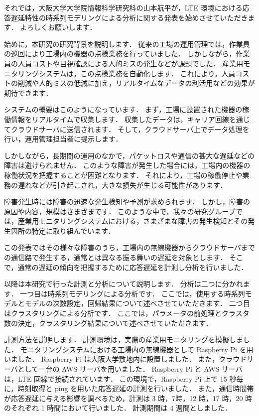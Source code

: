 \documentclass[a4j]{jarticle}
\begin{document}
それでは，大阪大学大学院情報科学研究科の山本航平が，LTE 環境における応答遅延特性の時系列モデリングによる分析に関する発表を始めさせていただきます．
よろしくお願いします．

始めに，本研究の研究背景を説明します．
従来の工場の運用管理では，作業員の巡回により工場内の機器の点検業務を行っていました．
しかしながら，作業員の人員コストや目視確認による人的ミスの発生などが課題でした．
産業用モニタリングシステムは，この点検業務を自動化します．
これにより，人員コストの削減や人的ミスの低減に加え，リアルタイムなデータの利活用などの効果が期待できます．

システムの概要はこのようになっています．
まず，工場に設置された機器の稼働情報をリアルタイムで収集します．
収集したデータは，キャリア回線を通じてクラウドサーバに送信されます．
そして，クラウドサーバ上でデータ処理を行い，運用管理担当者に提示します．

しかしながら，長期間の運用のなかで，パケットロスや通信の甚大な遅延などの障害は避けられません．
このような障害が発生した場合には，工場内の機器の稼働状況を把握することが困難となります．
それにより，工場の稼働停止や業務の遅れなどが引き起こされ，大きな損失が生じる可能性があります．

障害発生時には障害の迅速な発生検知や予測が求められます．
しかし，障害の原因や内容，規模はさまざまです．
このような中で，我々の研究グループでは，産業用モニタリングシステムにおける，さまざまな障害の発生検知とその発生箇所の特定に取り組んでいます．

この発表ではその様々な障害のうち，工場内の無線機器からクラウドサーバまでの通信路で発生する，通常とは異なる振る舞いの遅延を対象とします．
そこで，通常の遅延の傾向を把握するために応答遅延を計測し分析を行いました．

以降は本研究で行った計測と分析について説明します．
分析は二つに分かれます．
一つ目は時系列モデリングによる分析です．
ここでは，使用する時系列モデルとモデルの次数設定，回帰結果について述べさせていただきます．
二つ目はクラスタリングによる分析です．
ここでは，パラメータの前処理とクラスタ数の決定，クラスタリング結果について述べさせていただきます．

計測方法を説明します．
計測環境は，実際の産業用モニタリングを模擬しました．
モニタリングシステムにおける工場内の無線機器として Raspberry Pi を用いました．
Raspberry Pi は大阪大学敷地内に設置しました．
また，クラウドサーバとして一台の AWS サーバを用いました．
Raspberry Pi と AWS サーバは，LTE 回線で接続されています．
この環境で，Raspberry Pi 上で 15 秒毎に，時刻取得と ping を用いた応答遅延の計測を行いました．
また，通信時間帯が応答遅延に与える影響を調べるため，計測は 3 時，7時，12 時，17 時，20 時のそれぞれ 1 時間において行いました．
計測期間は 4 週間としました．
\end{document}
